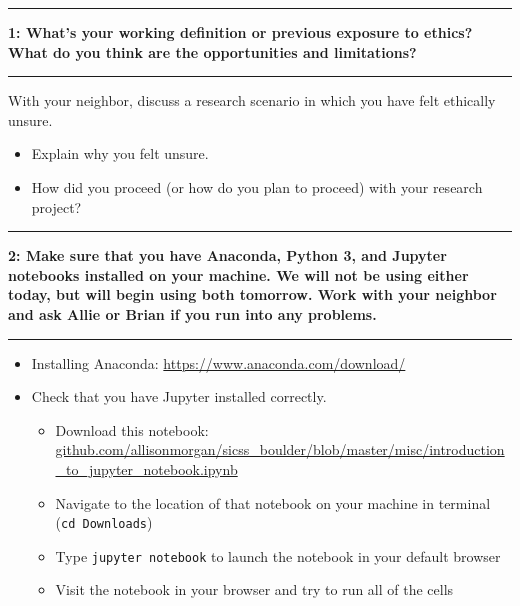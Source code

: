 \documentclass[11pt]{article}
\newcommand\question[2]{\vspace{.25in}\hrule\textbf{#1: #2}\vspace{.5em}\hrule\vspace{.10in}}
\begin{document}
\raggedright
\newcommand\NAME{Allie Morgan} 

\vspace{-0.2 in}
\question{1}{What's your working definition or previous exposure to ethics? What do you think are the opportunities and limitations?}
With your neighbor, discuss a research scenario in which you have felt ethically unsure. 
\begin{itemize}
\item Explain why you felt unsure. 
\item How did you proceed (or how do you plan to proceed) with your research project?
\end{itemize}

\vspace{1 in}
\question{2}{Make sure that you have Anaconda, Python 3, and Jupyter notebooks installed on your machine. We will not be using either today, but will begin using both tomorrow. Work with your neighbor and ask Allie or Brian if you run into any problems.} 
\begin{itemize}
\item Installing Anaconda: \href{https://www.anaconda.com/download/}{https://www.anaconda.com/download/}
\item Check that you have Jupyter installed correctly.
	\begin{itemize}
	\item Download this notebook: \href{https://github.com/allisonmorgan/sicss\_boulder/blob/master/misc/introduction\_to\_jupyter\_notebook.ipynb}{github.com/allisonmorgan/sicss\_boulder/blob/master/misc/introduction\_to\_jupyter\_notebook.ipynb}
	\item Navigate to the location of that notebook on your machine in terminal (\texttt{cd Downloads})
	\item Type \texttt{jupyter notebook} to launch the notebook in your default browser
	\item Visit the notebook in your browser and try to run all of the cells
	\end{itemize}
\end{itemize}
\end{document}

